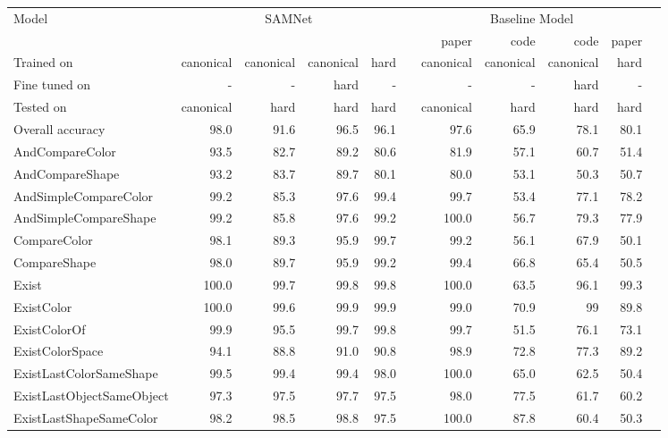 \begin{table*}[htb]
	\centering
	\begin{adjustbox}{width=\textwidth}
		\begin{tabular}{l r r r r r r r r r r}
			\toprule[1.25pt]
			Model & \multicolumn{4}{c}{SAMNet} &  &\multicolumn{4}{c}{Baseline Model} \\
			\cmidrule(lr){2-5} 
			\cmidrule(lr){7-10} 
			&&&&& & paper & code & code & paper\\
			\cmidrule(lr){7-10} 
			Trained on       & canonical & canonical & canonical & hard &           &  canonical  & canonical  & canonical & hard \\ 
			Fine tuned on  & - & - & hard  & - &           & -   & - & hard & - \\ 
			Tested on        & canonical & hard & hard & hard &            &canonical  & hard & hard & hard  \\ 
			\midrule[1pt]	
			Overall accuracy & 98.0 & 91.6 & 96.5  & 96.1 &           & 97.6  & 65.9 & 78.1& 80.1 \\ 
			\midrule[1pt]	
			AndCompareColor			&	93.5	&	82.7	&	89.2	&	80.6	&	&	81.9	&	57.1	&	60.7	&	51.4	 \\
			AndCompareShape			&	93.2	&	83.7	&	89.7	&	80.1	&	&	80.0	&	53.1	&	50.3	&	50.7 \\
			AndSimpleCompareColor		&	99.2	&	85.3	&	97.6	&	99.4	&	&	99.7	&	53.4	&	77.1	&	78.2 \\
			AndSimpleCompareShape		&	99.2	&	85.8	&	97.6	&	99.2	&	&	100.0	&	56.7	&	79.3	&	77.9 \\
			CompareColor			&	98.1	&	89.3	&	95.9	&	99.7	&	&	99.2	&	56.1	&	67.9	&	50.1 \\
			CompareShape			&	98.0	&	89.7	&	95.9	&	99.2	&	&	99.4	&	66.8	&	65.4	&	50.5	 \\
			Exist				&	100.0	&	99.7	&	99.8	&	99.8	&	&	100.0	&	63.5	&	96.1	&	99.3 \\
			ExistColor			&	100.0	&	99.6	&	99.9	&	99.9	&	&	99.0	&	70.9	&	99	&	89.8 \\
			ExistColorOf			&	99.9	&	95.5	&	99.7	&	99.8	&	&	99.7	&	51.5	&	76.1	&	73.1 \\
			ExistColorSpace			&	94.1	&	88.8	&	91.0	&	90.8	&	&	98.9	&	72.8	&	77.3	&	89.2 \\
			ExistLastColorSameShape		&	99.5	&	99.4	&	99.4	&	98.0	&	&	100.0	&	65.0	&	62.5	&	50.4 \\
			ExistLastObjectSameObject	&	97.3	&	97.5	&	97.7	&	97.5	&	&	98.0	&	77.5	&	61.7	&	60.2 \\
			ExistLastShapeSameColor		&	98.2	&	98.5	&	98.8	&	97.5	&	&	100.0	&	87.8	&	60.4	&	50.3 \\

\end{tabular}
\end{adjustbox}
\end{table*}
